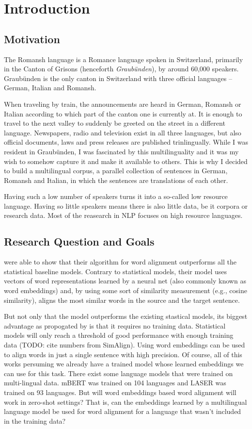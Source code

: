 \chapter{Introduction}
\section{Motivation}
The Romansh language is a Romance language spoken in Switzerland, primarily in the Canton of Grisons (henceforth \emph{Graubünden}), by around 60,000 speakers. 
Graubünden is the only canton in Switzerland with three official languages -- German, Italian and Romansh.

When traveling by train, the announcements are heard in German, Romansh or Italian according to which part of the canton one is currently at. 
It is enough to travel to the next valley to suddenly be greeted on the street in a different language.
Newspapers, radio and television exist in all three languages, but also official documents, laws and press releases are published trinlingually.
While I was resident in Graubünden, I was fascinated by this multilinguality and it was my wish to somehow capture it and make it available to others. 
This is why I decided to build a multilingual corpus, a parallel collection of  sentences in German, Romansh and Italian, in which the sentences are translations of each other.

Having such a low number of speakers turns it into a so-called low resource language. 
Having so little speakers means there is also little data, be it corpora or research data.
Most of the reasearch in NLP focuses on high resource languages. 


\section{Research Question and Goals}
\cite{jalili-sabet-etal-2020-simalign} were able to show that their algorithm for word alignment outperforms all the statistical baseline models. 
Contrary to statistical models, their model uses vectors of word representations learned by a neural net (also commonly known as word embeddings) and, by using some sort of similarity measurement (e.g., cosine similarity), aligns the most similar words in the source and the target sentence. 

But not only that the model outperforms the existing stastical models, its biggest advantage as propogated by \cite{jalili-sabet-etal-2020-simalign} is that it requires no training data. 
Statistical models will only reach a threshold of good performance with enough training data (TODO: cite numbers from SimAlign). 
Using word embeddings can be used to align words in just a single sentence with high precision. 
Of course, all of this works persuming we already have a trained model whose learned embeddings we can use for this task. 
There exist some language models that were trained on multi-lingual data. 
mBERT was trained on 104 languages and LASER was trained on 93 languages. 
But will word embeddings based word alignment will work in zero-shot settings? 
That is, can the embeddings learned by a multilingual language model be used for word alignment for a language that wasn't included in the training data?

